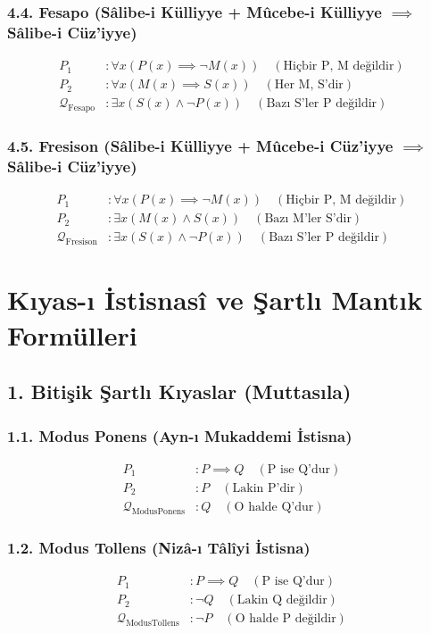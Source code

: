 \documentclass[11pt, a4paper]{article}
\begin{document}
\subsubsection{4.4. Fesapo (Sâlibe-i Külliyye + Mûcebe-i Külliyye $\implies$ Sâlibe-i Cüz'iyye)}
\begin{align}
P_1 &: \forall x (P(x) \implies \neg M(x)) \quad (\text{Hiçbir P, M değildir}) \\
P_2 &: \forall x (M(x) \implies S(x)) \quad (\text{Her M, S'dir}) \\
\mathcal{Q}_{\text{Fesapo}} &: \exists x (S(x) \land \neg P(x)) \quad (\text{Bazı S'ler P değildir})
\end{align}

\subsubsection{4.5. Fresison (Sâlibe-i Külliyye + Mûcebe-i Cüz'iyye $\implies$ Sâlibe-i Cüz'iyye)}
\begin{align}
P_1 &: \forall x (P(x) \implies \neg M(x)) \quad (\text{Hiçbir P, M değildir}) \\
P_2 &: \exists x (M(x) \land S(x)) \quad (\text{Bazı M'ler S'dir}) \\
\mathcal{Q}_{\text{Fresison}} &: \exists x (S(x) \land \neg P(x)) \quad (\text{Bazı S'ler P değildir})
\end{align}

\section{Kıyas-ı İstisnasî ve Şartlı Mantık Formülleri}

\subsection{1. Bitişik Şartlı Kıyaslar (Muttasıla)}

\subsubsection{1.1. Modus Ponens (Ayn-ı Mukaddemi İstisna)}
\begin{align}
P_1 &: P \implies Q \quad (\text{P ise Q'dur}) \\
P_2 &: P \quad (\text{Lakin P'dir}) \\
\mathcal{Q}_{\text{ModusPonens}} &: Q \quad (\text{O halde Q'dur})
\end{align}

\subsubsection{1.2. Modus Tollens (Nizâ-ı Tâlîyi İstisna)}
\begin{align}
P_1 &: P \implies Q \quad (\text{P ise Q'dur}) \\
P_2 &: \neg Q \quad (\text{Lakin Q değildir}) \\
\mathcal{Q}_{\text{ModusTollens}} &: \neg P \quad (\text{O halde P değildir})
\end{align}
\end{document}
